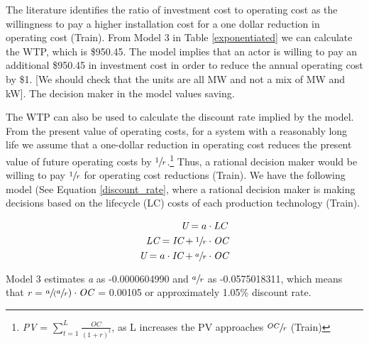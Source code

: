 \documentclass[10pt]{amsart}
\begin{document}
The literature identifies the ratio of investment cost to operating cost as the willingness to pay a higher installation cost for a one dollar reduction in operating cost \parencite{}(Train).
From Model 3 in Table \ref{exponentiated} we can calculate the WTP, which is \$950.45.
The model implies that an actor is willing to pay an additional \$950.45 in investment cost in order to reduce the annual operating cost by \$1. 
[We should check that the units are all MW and not a mix of MW and kW].  
The decision maker in the model values saving. 

The WTP can also be used to calculate the discount rate implied by the model.
From the present value of operating costs, for a system with a reasonably long life we assume that a one-dollar reduction in operating cost reduces the present value of future operating costs by $\sfrac{1}{r}$.\footnote{\textit{PV} = $\sum_{t=1}^L \frac{OC}{(1+r)^t}$, as L increases the PV approaches $\sfrac{OC}{r}$ \parencite{}(Train)}
Thus, a rational decision maker would be willing to pay $\sfrac{1}{r}$ for operating cost reductions \parencite{}(Train). 
We have the following model (See Equation \ref{discount_rate}, where a rational decision maker is making decisions based on the lifecycle (LC) costs of each production technology \parencite{}(Train).

\begin{equation}\label{discount_rate}
\begin{split}
\textit{U} = a\cdot LC \\
\textit{LC} = \textit{IC} + \sfrac{1}{r}\cdot\textit{OC} \\
\textit{U} = a\cdot\textit{IC} + \sfrac{a}{r}\cdot\textit{OC}
\end{split}
\end{equation}

Model 3 estimates \textit{a} as -0.0000604990 and $\sfrac{a}{r}$ as -0.0575018311, which means that \textit{r} = $\sfrac{a}({\sfrac{a}{r}})\cdot\textit{OC}$ = 0.00105 or approximately 1.05\% discount rate.
\end{document}
